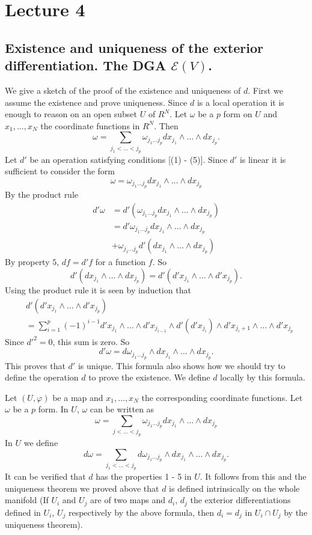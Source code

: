 \chapter{Lecture 4}

\section*{Existence and uniqueness of the exterior
  differentiation. The DGA $\mathscr{E}(V)$.}\pageoriginale

We give a sketch of the proof of the existence and uniqueness of
$d$. First we assume the existence and prove uniqueness. Since $d$ is
a local operation it is enough to reason on an open subset $U$ of
$R^{N}$. Let $\omega$ be a $p$ form on $U$ and $x_{1},\ldots,x_{N}$
the coordinate functions in $R^{N}$. Then
$$
\omega = \sum_{j_{1}<\ldots<j_{p}}\omega_{j_{1}\ldots
j_{p}}dx_{j_{1}}\wedge\ldots\wedge dx_{j_{p}}.
$$
Let $d'$ be an operation satisfying conditions [(1) - (5)]. Since $d'$
is linear it is sufficient to consider the form
$$
\omega=\omega_{j_{1}\ldots j_{p}} dx_{j_{1}}\wedge\ldots\wedge
dx_{j_{p}}
$$
By the product rule
\begin{align*}
d'\omega &=d'(\omega_{j_{1}\ldots j_{p}} dx_{j_{1}}\wedge\ldots\wedge
dx_{j_{p}})\\
&= d'\omega_{j_{1}\ldots j_{p}} dx_{j_{1}}\wedge\ldots\wedge
dx_{j_{p}}\\
&+\omega_{j_{1}\ldots j_{p}}d'(dx_{j_{1}}\wedge\ldots\wedge dx_{j_{p}})
\end{align*}
By property $5$, $df=d'f$ for a function $f$. So
$$
d'(dx_{j_{1}}\wedge\ldots\wedge
dx_{j_{p}})=d'(d'x_{j_{1}}\wedge\ldots\wedge d'x_{j_{p}}).
$$
Using the product rule it is seen by induction that
\begin{align*}
& d'(d'x_{j_{1}}\wedge\ldots\wedge d'x_{j_{p}})\\
& =\sum^{p}_{i=1}(-1)^{i-1}d'x_{j_{1}}\wedge\ldots\wedge
  d'x_{j_{i-1}}\wedge d'(d'x_{j_{i}})\wedge
  d'x_{j_{i}+1}\wedge\ldots\wedge d'x_{j_{p}}
\end{align*}\pageoriginale
Since ${d'}^{2}=0$, this sum is zero. So
$$
d'\omega=d\omega_{j_{1}\ldots j_{p}}\wedge
dx_{j_{1}}\wedge\ldots\wedge dx_{j_{p}}.
$$
This proves that $d'$ is unique. This formula also shows how we should
try to define the operation $d$ to prove the existence. We define $d$
locally by this formula.

Let $(U,\varphi)$ be a map and $x_{1},\ldots,x_{N}$ the corresponding
coordinate functions. Let $\omega$ be a $p$ form. In $U$, $\omega$ can
be written as
$$
\omega=\sum_{j<\ldots<j_{p}}\omega_{j_{1}\ldots
j_{p}} dx_{j_{1}}\wedge\ldots\wedge dx_{j_{p}}
$$
In $U$ we define
$$
d\omega=\sum_{j_{1}<\ldots<j_{p}}d\omega_{j_{1}\ldots j_{p}}\wedge
dx_{j_{1}}\wedge\ldots\wedge dx_{j_{p}}.
$$
It can be verified that $d$ has the properties 1 - 5 in $U$. It
follows from this and the uniqueness theorem we proved above that $d$
is defined intrinsically on the whole manifold (If $U_{i}$ and $U_{j}$
are of two maps and $d_{i}$, $d_{j}$ the exterior differentiations
defined in $U_{i}$, $U_{j}$ respectively by the above formula, then
$d_{i}=d_{j}$ in $U_{i}\cap U_{j}$ by the uniqueness theorem).

